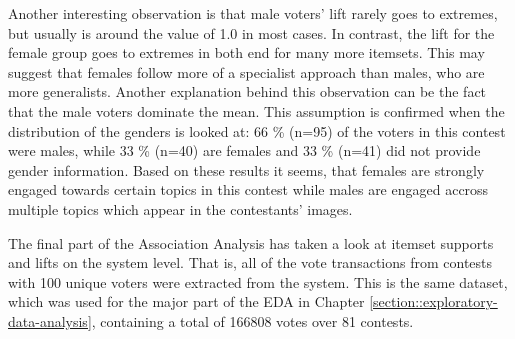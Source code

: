 Another interesting observation is that male voters' lift rarely goes to extremes, but usually is around the value of 1.0 in most cases. In contrast, the lift for the female group goes to extremes in both end for many more itemsets. This may suggest that females follow more of a specialist approach than males, who are more generalists. Another explanation behind this observation can be the fact that the male voters dominate the mean. This assumption is confirmed when the distribution of the genders is looked at: 66 \% (n=95) of the voters in this contest were males, while 33 \% (n=40) are females and 33 \% (n=41) did not provide gender information. Based on these results it seems, that females are strongly engaged towards certain topics in this contest while males are engaged accross multiple topics which appear in the contestants' images. 



The final part of the Association Analysis has taken a look at itemset supports and lifts on the system level. That is, all of the vote transactions from contests with 100 unique voters were extracted from the system. This is the same dataset, which was used for the major part of the EDA in Chapter \ref{section::exploratory-data-analysis}, containing a total of 166808 votes over 81 contests. 

